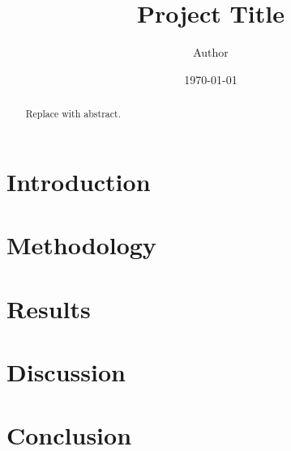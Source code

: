 \documentclass[12pt]{article}
\title{Project Title}
\author{Author}
\date{\today}
\begin{document}
\maketitle

\begin{abstract}
Replace with abstract.
\end{abstract}

\section{Introduction}
\section{Methodology}
\section{Results}
\section{Discussion}
\section{Conclusion}



\end{document}
